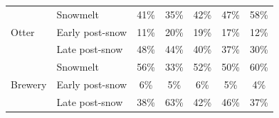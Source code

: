 \documentclass[12pt]{article}
\begin{document}
\begin{table}[h]
\begin{center}
\begin{tabular}{llccccc}
        \hline 
        \multirow{3}{*}{Otter} & Snowmelt & 
        41\% &
        35\% & 
        42\% & 
        47\% & 
        58\% \\
        & Early post-snow & 
        11\% &
        20\% & 
        19\% & 
        17\% & 
        12\% \\
        & Late post-snow & 
        48\% &
        44\% & 
        40\% & 
        37\% & 
        30\% \\
        
        \hline 
        \multirow{3}{*}{Brewery} & Snowmelt & 
        56\% &
        33\% & 
        52\% & 
        50\% & 
        60\% \\
        & Early post-snow & 
        6\% &
        5\% & 
        6\% & 
        5\% & 
        4\% \\
        & Late post-snow & 
        38\% &
        63\% & 
        42\% & 
        46\% & 
        37\% \\
    \end{tabular}
    \end{center}
\end{table}
\end{document}
